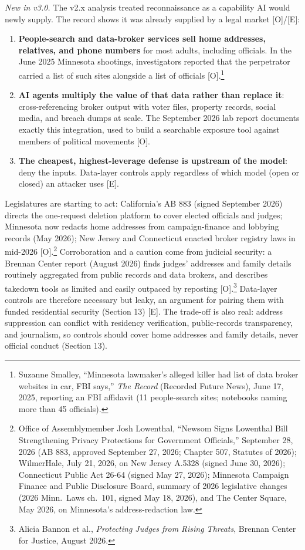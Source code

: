 \documentclass[11pt,letterpaper]{article}
\begin{document}
\textit{New in v3.0.} The v2.x analysis treated reconnaissance as a capability AI would newly supply. The record shows it was already supplied by a legal market [O]/[E]:
\begin{enumerate}
  \item \textbf{People-search and data-broker services sell home addresses, relatives, and phone numbers} for most adults, including officials. In the June 2025 Minnesota shootings, investigators reported that the perpetrator carried a list of such sites alongside a list of officials [O].\footnote{Suzanne Smalley, ``Minnesota lawmaker's alleged killer had list of data broker websites in car, FBI says,'' \textit{The Record} (Recorded Future News), June 17, 2025, reporting an FBI affidavit (11 people-search sites; notebooks naming more than 45 officials).}
  \item \textbf{AI agents multiply the value of that data rather than replace it}: cross-referencing broker output with voter files, property records, social media, and breach dumps at scale. The September 2026 lab report documents exactly this integration, used to build a searchable exposure tool against members of political movements [O].
  \item \textbf{The cheapest, highest-leverage defense is upstream of the model}: deny the inputs. Data-layer controls apply regardless of which model (open or closed) an attacker uses [E].
\end{enumerate}
Legislatures are starting to act: California's AB 883 (signed September 2026) directs the one-request deletion platform to cover elected officials and judges; Minnesota now redacts home addresses from campaign-finance and lobbying records (May 2026); New Jersey and Connecticut enacted broker registry laws in mid-2026 [O].\footnote{Office of Assemblymember Josh Lowenthal, ``Newsom Signs Lowenthal Bill Strengthening Privacy Protections for Government Officials,'' September 28, 2026 (AB 883, approved September 27, 2026; Chapter 507, Statutes of 2026); WilmerHale, July 21, 2026, on New Jersey A.5328 (signed June 30, 2026); Connecticut Public Act 26-64 (signed May 27, 2026); Minnesota Campaign Finance and Public Disclosure Board, summary of 2026 legislative changes (2026 Minn.\ Laws ch.\ 101, signed May 18, 2026), and The Center Square, May 2026, on Minnesota's address-redaction law.} Corroboration and a caution come from judicial security: a Brennan Center report (August 2026) finds judges' addresses and family details routinely aggregated from public records and data brokers, and describes takedown tools as limited and easily outpaced by reposting [O].\footnote{Alicia Bannon et al., \textit{Protecting Judges from Rising Threats}, Brennan Center for Justice, August 2026.} Data-layer controls are therefore necessary but leaky, an argument for pairing them with funded residential security (Section 13) [E]. The trade-off is also real: address suppression can conflict with residency verification, public-records transparency, and journalism, so controls should cover home addresses and family details, never official conduct (Section 13).
\end{document}

